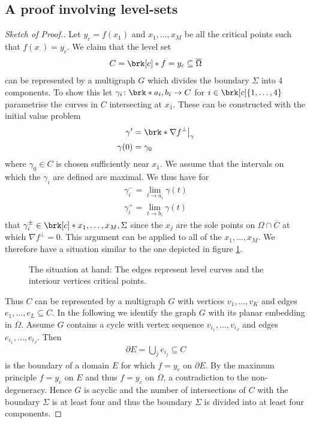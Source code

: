 \subsection{A proof involving level-sets}

\begin{proof}[Sketch of Proof.]
  Let $y_c=f(x_1)$ and $x_1,\dots,x_M$ be all the critical points such that $f(x_\cdot)=y_c$.
  We claim that the level set
  \begin{align*}
    C=\brk[c]*{f=y_c}\subseteq\overline{\Omega}
  \end{align*}
  can be represented by a multigraph $G$
  which divides the boundary $\Sigma$ into 4 components. To show this let $\gamma_i\colon \brk*{a_i,b_i}\to C$ for $i\in\brk[c]{1,\dots,4}$ parametrise the curves in
  $C$ intersecting at $x_1$. These can be constructed with the initial value problem
  \begin{align*} 
    \gamma'&=\brk*{\nabla f}^\perp\big\vert_\gamma \\
    \gamma(0) &= \gamma_0
  \end{align*}
  where $\gamma_0\in C$ is chosen sufficiently near $x_1$. We assume that the intervals on which the $\gamma_i$ are
  defined are maximal. We thus have for
  \begin{align*}
    \gamma_i^-=\lim_{t\to a_i}\gamma(t) \\
    \gamma_i^+=\lim_{t\to b_i}\gamma(t)
  \end{align*}
  that $\gamma_i^\pm\in\brk[c]*{x_1,\dots,x_M,\Sigma}$ since the $x_j$ are the sole points on $\Omega\cap\overline{C}$
  at which $\nabla f^\perp=0$. This argument can be applied to all of the 
  $x_1,\dots,x_M$. We therefore have a situation similar to the one depicted in figure \ref{fi:n2:levelSets:overview}.
  
  \begin{figure}
    \centering
    \def\svgwidth{0.6\textwidth}
    
    \caption{The situation at hand: The edges represent level curves and the interiour vertices critical points.}
    \label{fi:n2:levelSets:overview}
  \end{figure}

  Thus $C$ can be represented by a multigraph $G$ with vertices $v_1,\dots,v_K$ and edges $e_1,\dots,e_L\subseteq C$.
  In the following we identify the graph $G$ with its planar embedding in $\overline{\Omega}$.
  Assume $G$ contains a cycle with vertex sequence $v_{i_1},\dots,v_{i_J}$ and edges $e_{i_1},\dots,e_{i_J}$. Then
  \begin{align*}
    \partial E = \bigcup_j e_{i_j}\subseteq C
  \end{align*}
  is the boundary of a domain $E$ for which $f=y_c$ on $\partial E$. By the maximum principle $f=y_c$ on $E$ and thus
  $f=y_c$ on $\overline{\Omega}$, a contradiction to the non-degeneracy. Hence $G$ is acyclic and the number of 
  intersections of $C$ with the boundary $\Sigma$ is at least four and thus the boundary $\Sigma$ is divided into at least four components.
  

\end{proof}
